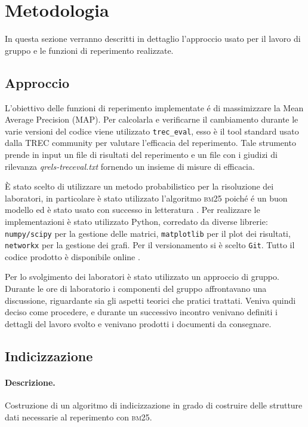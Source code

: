 \section{Metodologia}
\label{sec:metodologia}

In questa sezione verranno descritti in dettaglio l'approccio usato per il lavoro di gruppo e le funzioni di reperimento realizzate.


\subsection{Approccio}
\label{sec:approccio}

L'obiettivo delle funzioni di reperimento implementate \'e di massimizzare la Mean Average Precision (\textsc{MAP}). Per calcolarla e verificarne il cambiamento durante le varie versioni del codice viene utilizzato \texttt{trec\_eval}, esso \`e il tool standard usato dalla TREC community per valutare l'efficacia del reperimento. Tale strumento prende in input un file di risultati del reperimento e un file con i giudizi di rilevanza \textit{qrels-treceval.txt} fornendo un insieme di misure di efficacia.

\`E stato scelto di utilizzare un metodo probabilistico per la risoluzione dei laboratori, in particolare \`e stato utilizzato l'algoritmo \textsc{bm25} \cite{melucci2013information} poich\'e \'e un buon modello ed \`e stato usato con successo in letteratura \cite{croft2010search}.  Per realizzare le implementazioni \`e stato utilizzato Python, corredato da diverse librerie: \texttt{numpy/scipy} per la gestione delle matrici, \texttt{matplotlib} per il plot dei risultati, \texttt{networkx} per la gestione dei grafi.
Per il versionamento si \`e scelto \texttt{Git}. Tutto il codice prodotto \`e disponibile online \cite{repoonline}. 

Per lo svolgimento dei laboratori \`e stato utilizzato un approccio di gruppo. Durante le ore di laboratorio i componenti del gruppo affrontavano una discussione, riguardante sia gli aspetti teorici che pratici trattati. Veniva quindi deciso come procedere, e durante un successivo incontro venivano definiti i dettagli del lavoro svolto e venivano prodotti i documenti da consegnare.

\subsection{Indicizzazione} \label{sec:metodi-di-indic}

\paragraph{\textbf{Descrizione.}} 
Costruzione di un algoritmo di indicizzazione in grado di costruire delle strutture dati necessarie al reperimento con \textsc{bm25}. 

